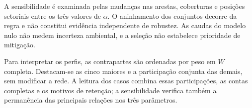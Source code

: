 A sensibilidade é examinada pelas mudanças nas arestas, coberturas e posições setoriais entre os três valores de $\alpha$. O aninhamento dos conjuntos decorre da regra e não constitui evidência independente de robustez. As caudas do modelo nulo não medem incerteza ambiental, e a seleção não estabelece prioridade de mitigação.

Para interpretar os perfis, as contrapartes são ordenadas por peso em $W$ completa. Destacam-se as cinco maiores e a participação conjunta das demais, sem modificar a rede. A leitura dos casos combina essas participações, as contas completas e os motivos de retenção; a sensibilidade verifica também a permanência das principais relações nos três parâmetros.
